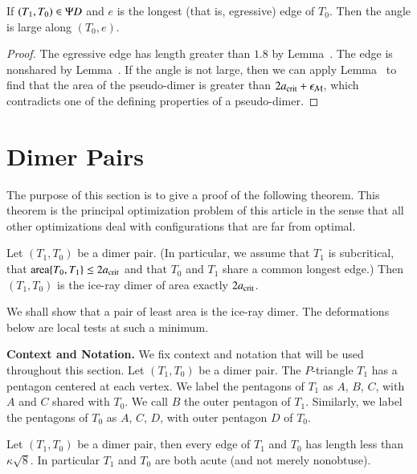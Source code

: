 \begin{corollary}
  If $(T_1,T_0)\in \Psi D$ and $e$ is the longest (that is, egressive)
  edge of $T_0$.  Then the angle is large along $(T_0,e)$.
\end{corollary}

\begin{proof} %
  The egressive edge has length greater than $1.8$ by Lemma~.
  The edge is nonshared by Lemma~.
  If the angle is not large, then we can apply Lemma~ to find that
  the area of the pseudo-dimer is greater than $2a_\text{crit} + \epsilon_{\mathcal M}$,
  which contradicts one of the defining properties of a pseudo-dimer.
\end{proof}

\section{Dimer Pairs}

The purpose of this section is to give a proof of the following
theorem.  This theorem is the principal optimization problem of this
article in the sense that all other optimizations deal with
configurations that are far from optimal.

\begin{theorem}
  Let $(T_1,T_0)$ be a dimer pair.  (In particular, we assume that
  $T_1$ is subcritical, that ${\operatorname{area}}\{T_0,T_1\}\le 2a_\text{crit}$ and that
  $T_0$ and $T_1$ share a common longest edge.)  Then $(T_1,T_0)$ is
  the ice-ray dimer of area exactly $2a_\text{crit}$.
\end{theorem}

We shall show that a pair of least area is the ice-ray dimer.
The deformations below are local tests at such a minimum.

\noindent
{\bf Context and Notation.} We fix context and
notation that will be used throughout this section. Let
$(T_1,T_0)$ be a dimer pair.  The $P$-triangle $T_1$ has a pentagon
centered at each vertex.  We label the pentagons of $T_1$ as $A$, $B$,
$C$, with $A$ and $C$ shared with $T_0$.  We call $B$ the outer
pentagon of $T_1$.  Similarly, we label the pentagons of $T_0$ as $A$,
$C$, $D$, with outer pentagon $D$ of $T_0$.

\begin{lemma}  
  Let $(T_1,T_0)$ be a dimer pair, then every edge of $T_1$ and $T_0$
  has length less than $\kappa\sqrt8$.  In particular $T_1$ and $T_0$
  are both acute (and not merely nonobtuse).
\end{lemma}

